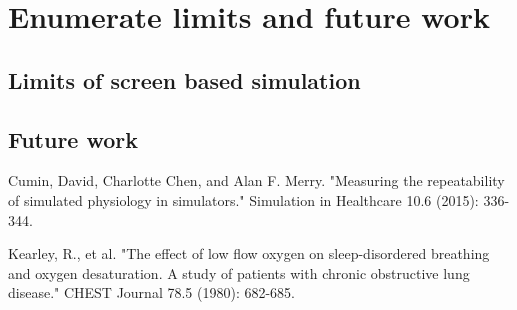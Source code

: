 \documentclass[a4paper]{article}
\begin{document}

\section{Enumerate limits and future work}
\subsection{Limits of screen based simulation}
\subsection{Future work}

\begin{thebibliography}{1}

   Cumin, David, Charlotte Chen, and Alan F. Merry. "Measuring the repeatability of simulated physiology in simulators." Simulation in Healthcare 10.6 (2015): 336-344.

  Kearley, R., et al. "The effect of low flow oxygen on sleep-disordered breathing and oxygen desaturation. A study of patients with chronic obstructive lung disease." CHEST Journal 78.5 (1980): 682-685.  



  \end{thebibliography}
\end{document}
